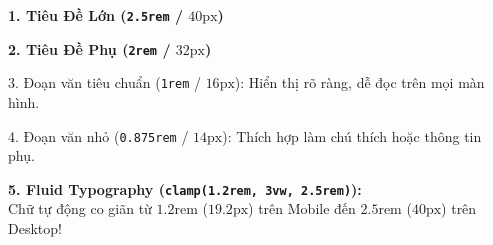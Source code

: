 \documentclass[11pt,oneside]{book}
\newcommand{\codeinline}[1]{\textcolor{accentOrange}{\texttt{#1}}}
\begin{document}
\begin{browserWindow}
\begin{tcolorbox}[arc=4pt, colback=white, colframe=primaryBlue!30, boxrule=0.8pt, top=10pt, bottom=10pt, left=12pt, right=12pt]
  {\sffamily\bfseries\Huge\color{primaryBlue} 1. Tiêu Đề Lớn (\codeinline{2.5rem} / $40\text{px}$)}\par\vspace{6pt}
  {\sffamily\large\color{secondaryTeal}\bfseries 2. Tiêu Đề Phụ (\codeinline{2rem} / $32\text{px}$)}\par\vspace{6pt}
  {\sffamily\small\color{darkText} 3. Đoạn văn tiêu chuẩn (\codeinline{1rem} / $16\text{px}$): Hiển thị rõ ràng, dễ đọc trên mọi màn hình.}\par\vspace{6pt}
  {\sffamily\fontsize{9}{11}\selectfont\color{gray!80} 4. Đoạn văn nhỏ (\codeinline{0.875rem} / $14\text{px}$): Thích hợp làm chú thích hoặc thông tin phụ.}\par\vspace{6pt}
  \begin{tcolorbox}[arc=3pt, colback=primaryBlue!5, colframe=primaryBlue!30, boxrule=0.6pt, top=4pt, bottom=4pt, left=8pt, right=8pt]
    {\sffamily\bfseries\color{accentOrange} 5. Fluid Typography (\codeinline{clamp(1.2rem, 3vw, 2.5rem)}):} \\
    {\sffamily\small Chữ tự động co giãn từ $1.2\text{rem}$ ($19.2\text{px}$) trên Mobile đến $2.5\text{rem}$ ($40\text{px}$) trên Desktop!}
  \end{tcolorbox}
\end{tcolorbox}
\end{browserWindow}
\end{document}
